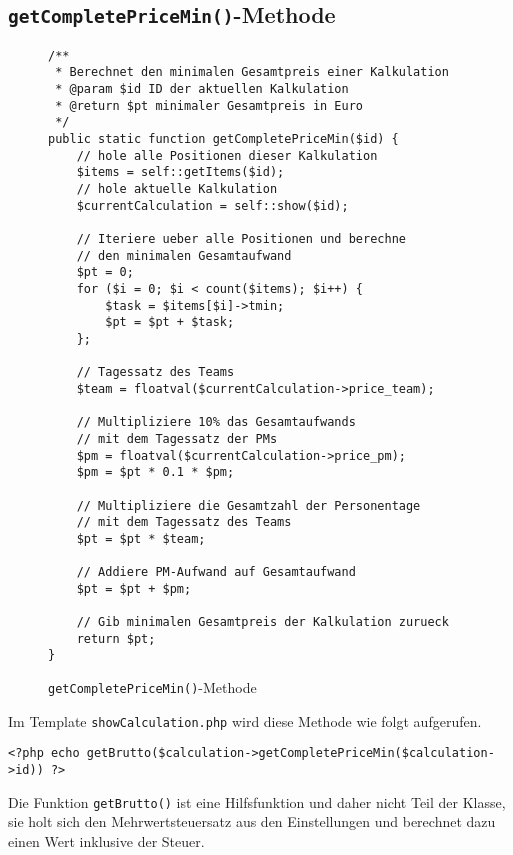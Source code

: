\subsection*{\texttt{getCompletePriceMin()}-Methode}
\label{fig:getCompletePriceMin}
\begin{figure}[htb]
\begin{lstlisting}
/**
 * Berechnet den minimalen Gesamtpreis einer Kalkulation
 * @param $id ID der aktuellen Kalkulation
 * @return $pt minimaler Gesamtpreis in Euro
 */
public static function getCompletePriceMin($id) {
	// hole alle Positionen dieser Kalkulation
	$items = self::getItems($id);
	// hole aktuelle Kalkulation
	$currentCalculation = self::show($id);
	
	// Iteriere ueber alle Positionen und berechne
	// den minimalen Gesamtaufwand 
	$pt = 0;
	for ($i = 0; $i < count($items); $i++) {
		$task = $items[$i]->tmin;
		$pt = $pt + $task;
	};
	
	// Tagessatz des Teams
	$team = floatval($currentCalculation->price_team);
	
	// Multipliziere 10% das Gesamtaufwands
	// mit dem Tagessatz der PMs
	$pm = floatval($currentCalculation->price_pm);
	$pm = $pt * 0.1 * $pm;
	
	// Multipliziere die Gesamtzahl der Personentage
	// mit dem Tagessatz des Teams
	$pt = $pt * $team;
	
	// Addiere PM-Aufwand auf Gesamtaufwand
	$pt = $pt + $pm;
	
	// Gib minimalen Gesamtpreis der Kalkulation zurueck
	return $pt;
}
\end{lstlisting}
\caption{\texttt{getCompletePriceMin()}-Methode}
\end{figure}

Im Template \texttt{showCalculation.php} wird diese Methode wie folgt
aufgerufen.
\begin{lstlisting}
<?php echo getBrutto($calculation->getCompletePriceMin($calculation->id)) ?>
\end{lstlisting}
Die Funktion \texttt{getBrutto()} ist eine Hilfsfunktion und daher nicht Teil
der Klasse, sie holt sich den Mehrwertsteuersatz aus den
Einstellungen und berechnet dazu einen Wert inklusive der Steuer.